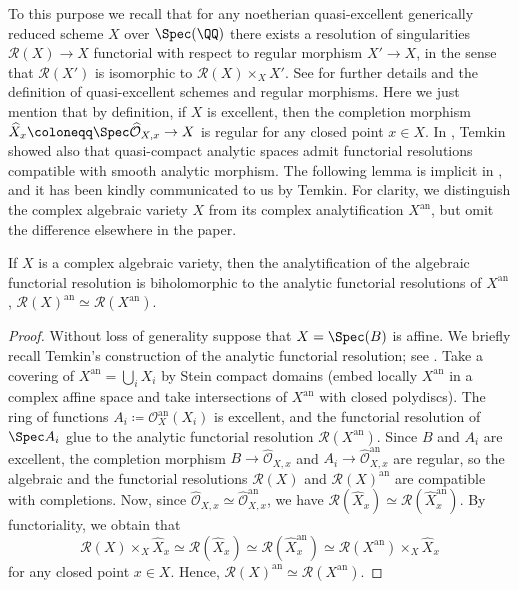 To this purpose we recall that for any noetherian quasi-excellent generically reduced scheme $X$ over $\Spec(\QQ)$ there exists a resolution of singularities $\mathcal{R}(X) \to X$ functorial with respect to regular morphism $X' \to X$, in the sense that $\mathcal{R}(X')$ is isomorphic to $\mathcal{R}(X) \times_{X} X'$. See \cite{Temkin2012} for further details and the definition of quasi-excellent schemes and regular morphisms. Here we just mention that by definition, if $X$ is excellent, then the completion morphism $\widehat{X}_x \coloneqq \Spec \widehat{\mathcal{O}}_{X,x} \to X$ is regular for any closed point $x \in X$. In \cite[Th.\,5.2.2]{Temkin2012}, Temkin showed also that quasi-compact analytic spaces admit functorial resolutions compatible with smooth analytic morphism. The following lemma is implicit in \cite{Temkin2012}, and it has been kindly communicated to us by Temkin. For clarity, we distinguish the complex algebraic variety $X$ from its complex analytification $X^{\mathrm{an}}$, but omit the difference elsewhere in the paper.
\begin{lem}\label{lem:analalg}
If $X$ is a complex algebraic variety, then the analytification of the algebraic functorial resolution is biholomorphic to the analytic functorial resolutions of $X^{\mathrm{an}}$, \ie
$\mathcal{R}(X)^{\mathrm{an}} \simeq \mathcal{R}(X^{\mathrm{an}})$.
\end{lem}
\begin{proof} Without loss of generality suppose that $X=\Spec(B)$ is affine.
We briefly recall Temkin's construction of the analytic functorial resolution; see \cite[Th.\,5.2.2]{Temkin2012}. Take a covering of $X^{\mathrm{an}} = \bigcup_{i} X_i$ by Stein compact domains (\eg embed locally $X^{\mathrm{an}}$ in a complex affine space and take intersections of $X^{\mathrm{an}}$ with closed polydiscs). The ring of functions $A_i \coloneqq \mathcal{O}^{\mathrm{an}}_{X}(X_i)$ is excellent, and the functorial resolution of $\Spec A_i$ glue to the analytic functorial resolution $\mathcal{R}(X^{\mathrm{an}})$. Since $B$ and $A_i$ are excellent, the completion morphism $B \to \widehat{\mathcal{O}}_{X, x}$ and $A_i \to \widehat{\mathcal{O}}^{\mathrm{an}}_{X, x}$ are regular, so the algebraic and the functorial resolutions $\mathcal{R}(X)$ and $\mathcal{R}(X)^{\mathrm{an}}$ are compatible with completions. Now, since $\widehat{\mathcal{O}}_{X, x}\simeq \widehat{\mathcal{O}}^{\mathrm{an}}_{X, x}$, we have $\mathcal{R}(\widehat{X}_x)\simeq \mathcal{R}(\widehat{X}^{\mathrm{an}}_x)$. By functoriality, we obtain that
\[
\mathcal{R}(X) \times_X \widehat{X}_x \simeq \mathcal{R}(\widehat{X}_x)\simeq \mathcal{R}(\widehat{X}^{\mathrm{an}}_x) \simeq \mathcal{R}(X^{\mathrm{an}}) \times_X \widehat{X}_x
\]
for any closed point $x \in X$. Hence, $\mathcal{R}(X)^{\mathrm{an}} \simeq \mathcal{R}(X^{\mathrm{an}})$.
\end{proof}

